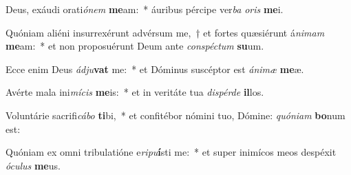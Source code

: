 \item Deus, exáudi orati\textit{ónem} \textbf{me}am:~* áuribus pércipe ver\textit{ba} \textit{oris} \textbf{me}i.
\item Quóniam aliéni insurrexérunt advérsum me,~† et fortes quæsiérunt á\textit{nimam} \textbf{me}am:~* et non proposuérunt Deum ante \textit{conspé\-ctum} \textbf{su}um.
\item Ecce enim Deus \textit{ádju}\textbf{vat} me:~* et Dóminus suscé\-ptor est \textit{ánimæ} \textbf{me}æ.
\item Avérte mala ini\textit{mícis} \textbf{me}is:~* et in veritáte tua \textit{dispérde} \textbf{il}los.
\item Voluntárie sacrifi\tinyhspace\textit{cábo} \textbf{ti}bi,~* et confitébor nómini tuo, Dómine: \textit{quóniam} \textbf{bo}num est:
\item Quóniam ex omni tribulatióne e\tinyhspace\textit{ripu}\textbf{í}sti me:~* et super inimícos meos despéxit \textit{óculus} \textbf{me}us.
